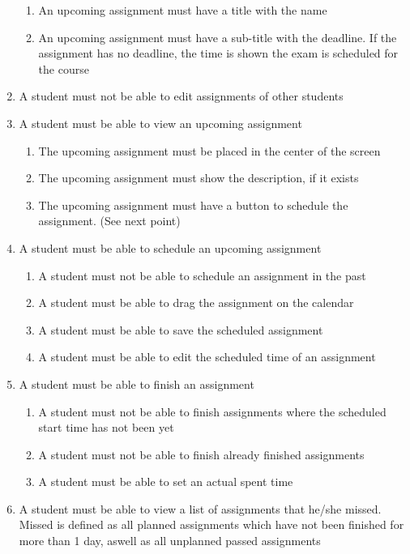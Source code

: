 \begin{enumerate}
\begin{enumerate}
      \item An upcoming assignment must have a title with the name

      \item An upcoming assignment must have a sub-title with the deadline.
        If the assignment has no deadline, the time is shown the exam is
        scheduled for the course
    \end{enumerate}

  \item A student must not be able to edit assignments of other students

  \item A student must be able to view an upcoming assignment
    \begin{enumerate}
      \item The upcoming assignment must be placed in the center of the screen

      \item The upcoming assignment must show the description, if it exists

      \item The upcoming assignment must have a button to schedule the assignment.
        (See next point)
    \end{enumerate}

  \item A student must be able to schedule an upcoming assignment
    \begin{enumerate}
      \item A student must not be able to schedule an assignment in the past

      \item A student must be able to drag the assignment on the calendar

      \item A student must be able to save the scheduled assignment

      \item A student must be able to edit the scheduled time of an assignment
    \end{enumerate}

  \item A student must be able to finish an assignment
    \begin{enumerate}
      \item A student must not be able to finish assignments where the scheduled
        start time has not been yet

      \item A student must not be able to finish already finished assignments

      \item A student must be able to set an actual spent time
    \end{enumerate}

  \item A student must be able to view a list of assignments that he/she missed.
    Missed is defined as all planned assignments which have not been finished
    for more than 1 day, aswell as all unplanned passed assignments

\end{enumerate}

